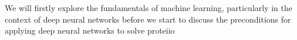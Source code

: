 We will firstly explore the fundamentals of machine learning, particularly in the context of deep neural networks before we start to discuss the preconditions for applying deep neural networks to solve proteiio